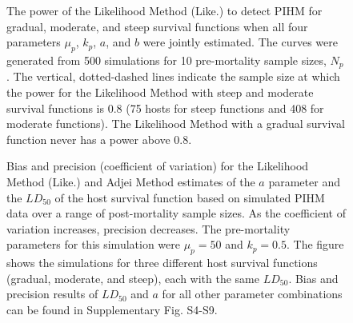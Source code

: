 \documentclass[12pt, a4paper]{article}
\begin{document}
\begin{figure}

    \captionsetup{justification=raggedright, singlelinecheck=false}

    \caption{\doublespacing The power of the Likelihood Method (Like.) to detect PIHM for gradual, moderate, and steep survival functions when all four parameters $\mu_p$, $k_p$, $a$, and $b$ were jointly estimated. The curves were generated from 500 simulations for 10 pre-mortality sample sizes, $N_p$. The vertical, dotted-dashed lines indicate the sample size at which the power for the Likelihood Method with steep and moderate survival functions is 0.8 (75 hosts for steep functions and 408 for moderate functions). The Likelihood Method with a gradual survival function never has a power above 0.8.}

    \label{fig:real_power}

\end{figure}

\begin{figure}


    \captionsetup{justification=raggedright, singlelinecheck=false}

    \caption{\doublespacing Bias and precision (coefficient of variation) for the Likelihood Method (Like.) and Adjei Method estimates of the $a$ parameter and the $LD_{50}$ of the host survival function based on simulated PIHM data over a range of post-mortality sample sizes.  As the coefficient of variation increases, precision decreases. The pre-mortality parameters for this simulation were $\mu_p = 50$ and $k_p = 0.5$.  The figure shows the simulations for three different host survival functions (gradual, moderate, and steep), each with the same $LD_{50}$.  Bias and precision results of $LD_{50}$ and $a$ for all other parameter combinations can be found in Supplementary Fig. S4-S9.}

    \label{fig:question2}

\end{figure}


\setcounter{figure}{0}
\renewcommand\thefigure{S\arabic{figure}}
\end{document}
